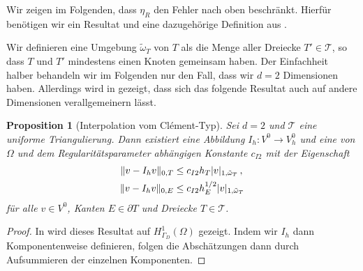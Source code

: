 \documentclass{scrartcl}
\newcounter{everything}
\newtheorem{proposition}[everything]{Proposition}
\newcommand{\cT}{\mathcal{T}}
\newcommand{\tiomega}{\tilde{\omega}}
\DeclarePairedDelimiter{\abs}{\lvert}{\rvert}
\DeclarePairedDelimiter{\norm}{\lVert}{\rVert}
\begin{document}
Wir zeigen im Folgenden, dass $\eta_R$ den Fehler nach oben beschränkt. Hierfür benötigen wir ein Resultat und eine dazugehörige Definition aus \cite[S.6f.]{Ver-2013}.

Wir definieren eine Umgebung $\tiomega_T$ von $T$ als die Menge aller Dreiecke $T'\in\cT$, so dass $T$ und $T'$ mindestens einen Knoten gemeinsam haben.\label{ch:DefinitionOmegaTildeT}
Der Einfachheit halber behandeln wir im Folgenden nur den Fall, dass wir $d=2$ Dimensionen haben. Aller\-dings wird in \cite[S.108ff.]{Ver-2013} gezeigt, dass sich das folgende Resultat auch auf andere Dimensionen verallgemeinern lässt.
\begin{proposition}[Interpolation vom Clément-Typ]\label{pr:ClementInterpolation}
	Sei $d=2$ und $\cT$ eine uniforme Triangulierung. Dann existiert eine Abbildung $I_h\colon V^0\to V_h^0$ und eine von $\Omega$ und dem Regularitätsparameter abhängigen Konstante $c_{I2}$ mit der Eigenschaft
	\begin{align*}
		\norm{v-I_hv}_{0,T}&\leq c_{I2}h_T\abs{v}_{1,\tilde{\omega}_T}\,, \\
		\norm{v-I_hv}_{0,E}&\leq c_{I2}h_E^{1/2}\abs{v}_{1,\tilde{\omega}_T}
	\end{align*}
	für alle $v\in V^0$, Kanten $E\in\partial T$ und Dreiecke $T\in\cT$.
\end{proposition}
\begin{proof}
	In \cite[S.8]{Ver-2013} wird dieses Resultat auf $H^1_{\Gamma_D}(\Omega)$ gezeigt. Indem wir $I_h$ dann Komponentenweise definieren, folgen die Abschätzungen dann durch Aufsummieren der einzelnen Komponenten.
\end{proof}
\end{document}
